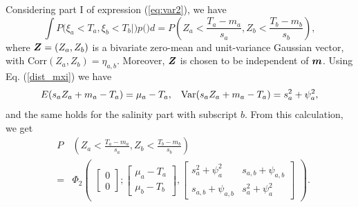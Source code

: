 \documentclass[aoas]{imsart}
\begin{document}
Considering part I of expression (\ref{eq:var2}), we have
\begin{equation}\label{part1:phi2}
 \int P(\xi_a < T_a, \xi_b < T_b|\bm) p(\bm) d\bm= 
P \left( Z_{a} < \frac{T_a-m_{a}}{s_{a}}, 
Z_{b} < \frac{T_b-m_{b}}{s_{b}} \right), \nonumber
\end{equation}
where ${\boldsymbol Z}=(Z_{a},Z_{b})$ is a bivariate zero-mean and unit-variance Gaussian vector, with $\mbox{Corr}(Z_{a},Z_{b})=\eta_{a,b}$. Moreover, ${\boldsymbol Z}$ is chosen to be independent of ${\boldsymbol m}$. Using Eq. (\ref{dist_mxi}) we have
\begin{equation}
    E(s_{a} Z_{a}+m_{a}-T_a) = \mu_{a}-T_a, \hspace{3mm}
    \mbox{Var}(s_{a} Z_{a}+m_{a}-T_a) = s^2_a+ \psi^2_{a}, 
\end{equation}
and the same holds for the salinity part with subscript $b$. From this calculation, we get
\begin{eqnarray}\label{two_parts0}
& P & \left( Z_{a} < \frac{T_a-m_{a}}{s_{a}}, 
Z_{b} < \frac{T_b-m_{b}}{s_{b}} \right) \\
&=& \Phi_2 \begin{pmatrix} 
\begin{bmatrix} 0\\
0
\end{bmatrix};
\begin{bmatrix} \mu_{a}-T_a\\
\mu_{b}-T_b
\end{bmatrix},\begin{bmatrix}
s^2_a+ \psi^2_{a} & s_{a,b}+\psi_{a,b}  \\
s_{a,b}+\psi_{a,b}   & s^2_a+ \psi^2_{a} 
\end{bmatrix}\end{pmatrix} \nonumber.
\end{eqnarray}
\end{document}
